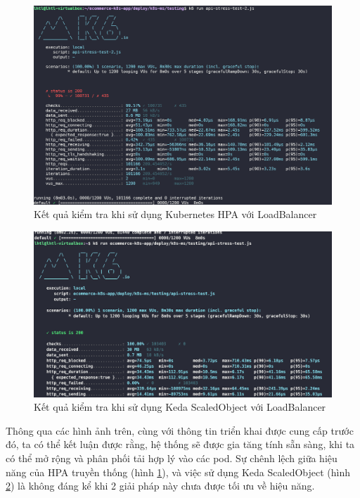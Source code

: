 \begin{figure}[H]
  \begin{center}
    \includegraphics[scale=0.63]{images/hanh/component-catalog-hpa-cpu}
  \end{center}
  \caption{Kết quả kiểm tra khi sử dụng Kubernetes HPA với LoadBalancer}
  \label{fig:component-hpa}

\end{figure}

\begin{figure}[H]
  \begin{center}
    \includegraphics[scale=0.15]{images/hanh/component-catalog-hpa-keda}
  \end{center}
  \caption{Kết quả kiểm tra khi sử dụng Keda ScaledObject với LoadBalancer}
  \label{fig:component-keda}

\end{figure}

\noindent Thông qua các hình ảnh trên, cùng với thông tin triển khai được cung cấp trước đó, ta có thể kết luận được rằng, hệ thống sẽ được gia tăng tính sẵn sàng, khi ta có thể mở rộng và phân phối tải hợp lý vào các pod. Sự chênh lệch giữa hiệu năng của HPA truyền thống (hình \ref{fig:component-hpa}), và việc sử dụng Keda ScaledObject (hình \ref{fig:component-keda}) là không đáng kể khi 2 giải pháp này chưa được tối ưu về hiệu năng.

